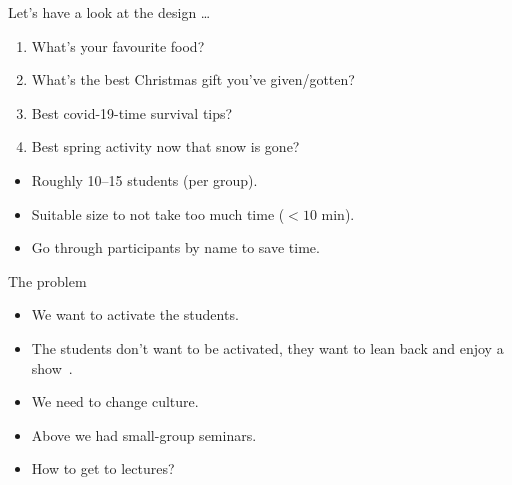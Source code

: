 \begin{frame}
  Let's have a look at the design \dots
\end{frame}

\begin{frame}
  \begin{solution}
    \begin{enumerate}
      \item What's your favourite food?
      \item What's the best Christmas gift you've given/gotten?
      \item Best covid-19-time survival tips?
      \item Best spring activity now that snow is gone?
    \end{enumerate}
  \end{solution}

  \begin{example}
    \begin{itemize}
      \item Roughly 10--15 students (per group).
      \item Suitable size to not take too much time (\(< 10\) min).
      \item Go through participants by name to save time.
    \end{itemize}
  \end{example}
\end{frame}

\begin{frame}
  \begin{block}{The problem}
    \begin{itemize}
      \item We want to activate the students.
      \item The students don't want to be activated, they want to lean back and 
        enjoy a show~\cite{ActualVSFeelingOfLearning}.
      \item We need to change culture.
    \end{itemize}
  \end{block}

  \begin{question}
    \begin{itemize}
      \item Above we had small-group seminars.
      \item How to get to lectures?
    \end{itemize}
  \end{question}
\end{frame}

